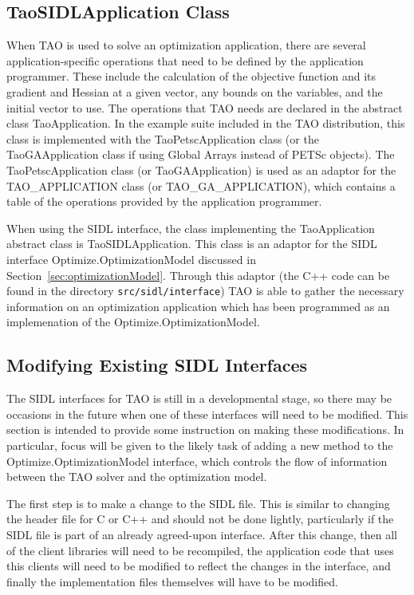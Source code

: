 \documentclass[doublespacing,12pt]{article}
\begin{document}
\subsection{TaoSIDLApplication Class}
When TAO is used to solve an optimization application, there are several 
application-specific operations that need to be defined by the application
programmer.  These include the calculation of the objective function
and its gradient 
and Hessian at a given vector, any bounds on the variables, and the initial
vector to use.  The operations that TAO needs are declared in the abstract 
class \textsf{TaoApplication}.  In the example suite included in the TAO 
distribution, this class is implemented with the 
\textsf{TaoPetscApplication} class (or 
the \textsf{TaoGAApplication} class if using Global Arrays instead of PETSc 
objects).  The TaoPetscApplication class (or TaoGAApplication) is used as an 
adaptor for the \textsf{TAO\_APPLICATION} class (or 
\textsf{TAO\_GA\_APPLICATION}), which contains a table of the 
operations provided by the application programmer.

When using the SIDL interface, the class implementing the 
\textsf{TaoApplication}
abstract class is \textsf{TaoSIDLApplication}.  This class is an adaptor for 
the SIDL interface \textsf{Optimize.Op\-ti\-mi\-za\-tion\-Mod\-el} discussed in 
Section~\ref{sec:optimizationModel}.  Through this adaptor (the C++ 
code can be found in the directory \texttt{src/sidl/interface}) TAO is able to 
gather the necessary information on an optimization application which has
been programmed as an implemenation of the 
\textsf{Optimize.Op\-ti\-mi\-za\-tion\-Mod\-el}.

\subsection{Modifying Existing SIDL Interfaces}
The SIDL interfaces for TAO is still in a developmental stage, so
there may be occasions in the future when one of these interfaces will 
need to be modified.  This section is intended to provide some
instruction on making these modifications.  In particular, focus will
be given to the likely task of adding a new method to the
\textsf{Optimize.Op\-ti\-mi\-za\-tion\-Mod\-el} interface, which controls the flow of
information between the TAO solver and the optimization model.

The first step is to make a change to the SIDL file.  This is similar
to changing the header file for C or C++ and should not be done
lightly, particularly if the SIDL file is part of an already
agreed-upon interface.  After this change, then all of the client
libraries will need to be recompiled, the application code that uses
this clients will need to be modified to reflect the changes in the
interface, and finally the implementation files themselves will have
to be modified.
\end{document}
